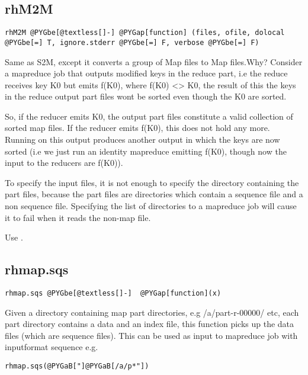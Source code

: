 \documentclass[letterpaper,10pt,english]{manual}
\begin{document}
\subsection{rhM2M}

\begin{Verbatim}[commandchars=@\[\]]
rhM2M @PYGbe[@textless[]-] @PYGap[function] (files, ofile, dolocal @PYGbe[=] T, ignore.stderr @PYGbe[=] F, verbose @PYGbe[=] F)
\end{Verbatim}

Same as S2M, except it converts a group of Map files to Map files.Why?
Consider a mapreduce job that outputs modified keys in the reduce part, i.e the
reduce receives key K0 but emits f(K0), where f(K0) \textless{}\textgreater{} K0, the result of this
the keys in the reduce output part files wont be sorted even though the K0 are
sorted.

So, if the reducer emits K0, the output part files constitute a valid collection
of sorted map files. If the reducer emits f(K0), this does not hold any
more. Running  on this output produces another output in which the keys
are now sorted (i.e we just run an identity mapreduce emitting f(K0), though now
the input to the reducers are f(K0)).

To specify the input files, it is not enough to specify the directory
containing the part files, because the part files are directories which contain
a sequence file and a non sequence file. Specifying the list of directories to a
mapreduce job will cause it to fail when it reads the non-map file.

Use  .


\subsection{rhmap.sqs}

\begin{Verbatim}[commandchars=@\[\]]
rhmap.sqs @PYGbe[@textless[]-]  @PYGap[function](x)
\end{Verbatim}

Given a directory containing map part directories, e.g /a/part-r-00000/ etc,
each part directory contains a data and an index file, this function picks up
the data files (which are sequence files). This can be used as input to
mapreduce job with inputformat sequence e.g.

\begin{Verbatim}[commandchars=@\[\]]
rhmap.sqs(@PYGaB["]@PYGaB[/a/p*"])
\end{Verbatim}
\end{document}
